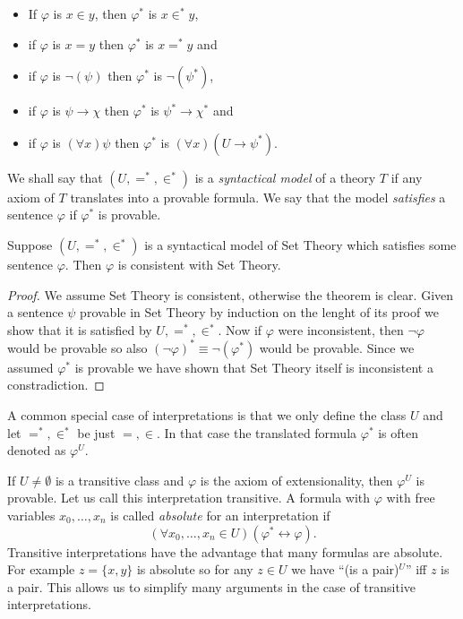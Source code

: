 \begin{itemize}
 \item[] If $\varphi$ is $x\in y$, then $\varphi^*$ is $x\in^* y$,
 \item[] if $\varphi$ is $x = y$ then $\varphi^*$ is $x=^*y$ and
 \item[] if $\varphi$ is $\neg(\psi)$ then $\varphi^*$ is $\neg(\psi^*)$,
 \item[] if $\varphi$ is $\psi\rightarrow\chi$ then $\varphi^*$ is $\psi^*\rightarrow\chi^*$ and
 \item[] if $\varphi$ is $(\forall x)\psi$ then $\varphi^*$ is $(\forall x)(U\rightarrow\psi^*)$.
\end{itemize}

We shall say that $(U,=^*,\in^*)$ is a \emph{syntactical model} of a theory $T$ if any axiom of
$T$ translates into a provable formula. We say that the model \emph{satisfies} a sentence $\varphi$ if $\varphi^*$
is provable.

\begin{metatheorem} Suppose $(U,=^*,\in^*)$ is a syntactical model of Set Theory which satisfies
some sentence $\varphi$. Then $\varphi$ is consistent with Set Theory.
\end{metatheorem}
\begin{proof} We assume Set Theory is consistent, otherwise the theorem is clear.
Given a sentence $\psi$ provable in Set Theory by induction on the lenght of its proof we
show that it is satisfied by $U,=^*,\in^*$. Now if $\varphi$ were inconsistent,
then $\neg\varphi$ would be provable so also $(\neg\varphi)^*\equiv\neg(\varphi^*)$ would be
provable. Since we assumed $\varphi^*$ is provable we have shown that Set Theory itself is inconsistent
a constradiction.
\end{proof}

A common special case of interpretations is that we only define the class $U$ and let $=^*,\in^*$
be just $=,\in$. In that case the translated formula $\varphi^*$ is often denoted as $\varphi^U$.

\begin{example} If $U\neq\emptyset$ is a transitive class and $\varphi$ is the axiom of extensionality, then
 $\varphi^U$ is provable. Let us call this interpretation transitive. A formula with $\varphi$ with
 free variables $x_0,\ldots,x_n$ is called \emph{absolute} for an interpretation if
 $$
 (\forall x_0,\ldots,x_n\in U)(\varphi^*\leftrightarrow\varphi).
 $$
 Transitive interpretations have the advantage that many formulas are absolute.
 For example $z=\{x,y\}$ is absolute so for any $z\in U$ we have ``(is a pair)$^U$''
 iff $z$ is a pair. This allows us to simplify many arguments in the case of transitive interpretations.
\end{example}

